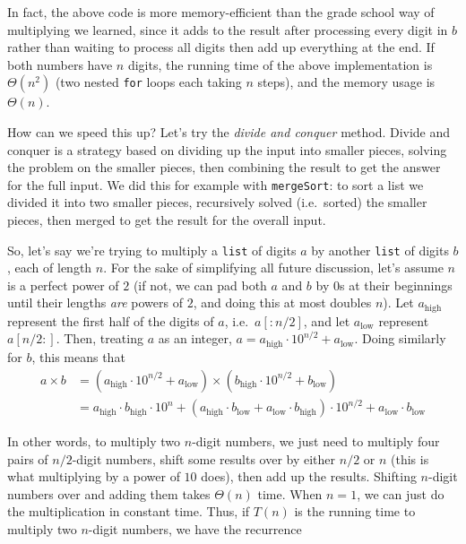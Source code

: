 \documentclass[11pt]{article}
\begin{document}
In fact, the above code is more memory-efficient than the
grade school way of multiplying we learned, since it adds to the
result after processing every digit in $b$ rather than waiting to
process all digits then add up everything at the end.
If both numbers have $n$ digits, the running time of the above
implementation is $\Theta(n^2)$ (two nested \texttt{for} loops each
taking $n$ steps), and the memory usage is $\Theta(n)$.

How can we speed this up?  Let's try the {\em divide and conquer}
method.  Divide and conquer is a strategy based on dividing up the
input into smaller pieces, solving the problem on the smaller pieces,
then combining the result to get the answer for the full input.  We
did this for example with \texttt{mergeSort}: to sort a list we
divided it into two smaller pieces, recursively solved (i.e.\ sorted)
the smaller pieces, then merged to get the result for the overall
input.

So, let's say we're trying to multiply a \texttt{list} of digits $a$
by another \texttt{list} of digits $b$, each of length $n$.  
For the sake of simplifying all future discussion, let's assume $n$ is
a perfect power of $2$ (if not, we can pad both $a$ and $b$ by $0$s
at their beginnings until their lengths {\em are} powers of $2$, and
doing this at most doubles $n$).
Let $a_{\mathrm{high}}$ represent the first half of the digits of $a$,
i.e.\ $a[:n/2]$, and let $a_{\mathrm{low}}$ represent $a[n/2:]$.
Then, treating $a$ as an integer, $a = a_{\mathrm{high}}\cdot 10^{n/2}
+ a_{\mathrm{low}}$.  Doing similarly for $b$, this means that
\begin{align*}
a\times b &= (a_{\mathrm{high}}\cdot 10^{n/2}
+ a_{\mathrm{low}}) \times (b_{\mathrm{high}}\cdot 10^{n/2}
+ b_{\mathrm{low}}) \\
&{}= a_{\mathrm{high}}\cdot b_{\mathrm{high}}\cdot 10^n +
(a_{\mathrm{high}}\cdot b_{\mathrm{low}} +
a_{\mathrm{low}}\cdot b_{\mathrm{high}})\cdot 10^{n/2} +
a_{\mathrm{low}}\cdot b_{\mathrm{low}}
\end{align*}

In other words, to multiply two $n$-digit numbers, we just need to
multiply four pairs of $n/2$-digit numbers, shift some results over by
either $n/2$ or $n$ (this is what multiplying by a power of $10$
does), then add up the results.  Shifting $n$-digit numbers over and
adding them takes $\Theta(n)$ time.  
When $n = 1$, we can just do the multiplication in constant time.
Thus, if $T(n)$ is the running
time to multiply two $n$-digit numbers, we have the recurrence
\end{document}
